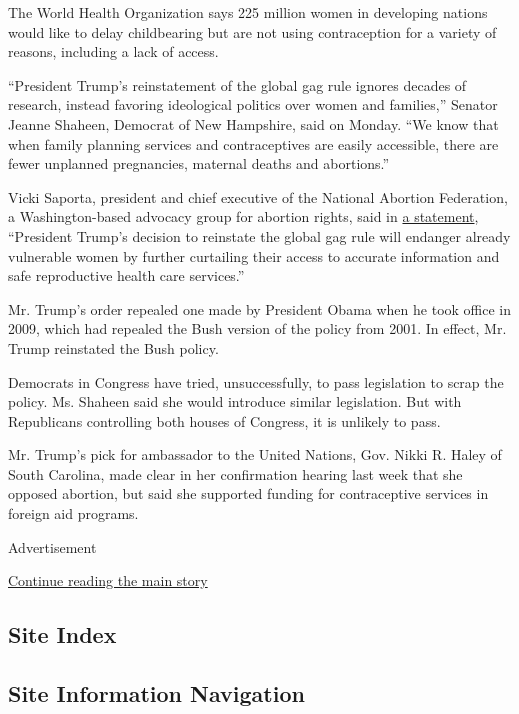The World Health Organization says 225 million women in developing
nations would like to delay childbearing but are not using contraception
for a variety of reasons, including a lack of access.

``President Trump's reinstatement of the global gag rule ignores decades
of research, instead favoring ideological politics over women and
families,'' Senator Jeanne Shaheen, Democrat of New Hampshire, said on
Monday. ``We know that when family planning services and contraceptives
are easily accessible, there are fewer unplanned pregnancies, maternal
deaths and abortions.''

Vicki Saporta, president and chief executive of the National Abortion
Federation, a Washington-based advocacy group for abortion rights, said
in
\href{https://prochoice.org/this-draconian-policy-has-been-devastating/}{a
statement}, ``President Trump's decision to reinstate the global gag
rule will endanger already vulnerable women by further curtailing their
access to accurate information and safe reproductive health care
services.''

Mr. Trump's order repealed one made by President Obama when he took
office in 2009, which had repealed the Bush version of the policy from
2001. In effect, Mr. Trump reinstated the Bush policy.

Democrats in Congress have tried, unsuccessfully, to pass legislation to
scrap the policy. Ms. Shaheen said she would introduce similar
legislation. But with Republicans controlling both houses of Congress,
it is unlikely to pass.

Mr. Trump's pick for ambassador to the United Nations, Gov. Nikki R.
Haley of South Carolina, made clear in her confirmation hearing last
week that she opposed abortion, but said she supported funding for
contraceptive services in foreign aid programs.

Advertisement

\protect\hyperlink{after-bottom}{Continue reading the main story}

\hypertarget{site-index}{%
\subsection{Site Index}\label{site-index}}

\hypertarget{site-information-navigation}{%
\subsection{Site Information
Navigation}\label{site-information-navigation}}


